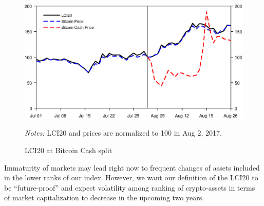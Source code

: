 \documentclass[11pt]{article}
\newcommand\fnotes[1]{\captionsetup{font=scriptsize}\caption*{\textsl{Notes:} #1}}
\begin{document}
\begin{figure}[ht]%
    \centering%
    \caption{LCI20 at Bitcoin Cash split}\label{f:split}%
    \includegraphics[width=.8\textwidth]{figs/lci20_bch_split.eps}%
    \smallskip\newline%
    \fnotes{LCI20 and prices are normalized to 100 in Aug 2, 2017.}
\end{figure}

Immaturity of markets may lead right now to frequent changes of assets included in the lower ranks of our index.
However, we want our definition of the LCI20 to be ``future-proof'' and expect volatility among ranking of crypto-assets in terms of market capitalization to decrease in the upcoming two years.







%
%
\end{document}
